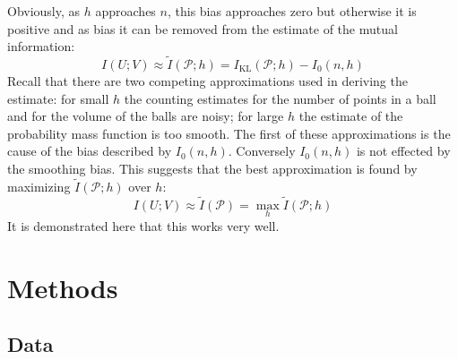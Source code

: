 \documentclass[12pt]{article}
\begin{document}
Obviously, as $h$ approaches $n$, this bias approaches zero but
otherwise it is positive and as bias it can be removed from the
estimate of the mutual information:
\begin{equation}
I(U;V)\approx\tilde{I}(\mathcal{P};h)=I_{\text{KL}}(\mathcal{P};h)-I_0(n,h)
\end{equation}
Recall that there are two competing approximations used in deriving
the estimate: for small $h$ the counting estimates for the number of
points in a ball and for the volume of the balls are noisy; for large
$h$ the estimate of the probability mass function is too smooth. The
first of these approximations is the cause of the bias described by
$I_0(n,h)$. Conversely $I_0(n,h)$ is not effected by the smoothing
bias. This suggests that the best approximation is found by maximizing
$\tilde{I}(\mathcal{P};h)$ over $h$:
\begin{equation}
I(U;V)\approx\tilde{I}(\mathcal{P})=\max_h{\tilde{I}(\mathcal{P};h)}
\end{equation}
It is demonstrated here that this works very well.

\section{Methods}

\subsection{Data}
\end{document}
